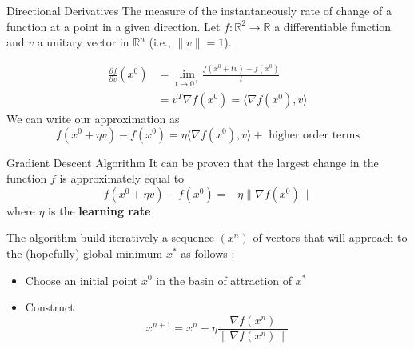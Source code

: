\documentclass{beamer}
\begin{document}
\begin{frame}{Directional Derivatives}
	The measure of the instantaneously rate of change of a function at a point in a given direction. 
	Let $f\colon \mathbb{R}^2 \to \mathbb{R}$ a differentiable function and $v$ a unitary vector in $\mathbb{R}^n$ (i.e., $\|v\|=1$). 

\begin{equation*}
	\begin{split}
		\frac{\partial f}{\partial v}(x^0)& = \lim_{t \to 0^+}\frac{f(x^0+tv)-f(x^0)}{t}\\
		&= v^T \nabla f(x^0) = \langle \nabla f(x^0), v \rangle
	\end{split}
\end{equation*}
We can write our approximation as
\begin{equation*}
	f(x^0+ \eta v)-f(x^0)= \eta \langle \nabla f(x^0), v \rangle + \text{ higher order terms}
\end{equation*}

\end{frame}

\begin{frame}{Gradient Descent Algorithm}
	It can be proven that the largest change in the function $f$ is approximately equal to 
	\begin{equation*}
		f(x^0+ \eta v)-f(x^0)= -\eta  \| \nabla f(x^0)\| 
	\end{equation*}
where $\eta$ is the \textbf{learning rate}

The algorithm build iteratively a sequence $(x^n)$ of vectors that will approach to the (hopefully) global minimum $x^*$ as follows :
\begin{itemize}
	\item Choose an initial point $x^0$ in the basin of attraction of  $x^*$
	\item Construct 
	\begin{equation*}
		x^{n+1}= x^n - \eta \frac{\nabla f(x^n)}{\| \nabla f(x^n)\|}
	\end{equation*} 
\end{itemize}
\end{frame}
\end{document}
